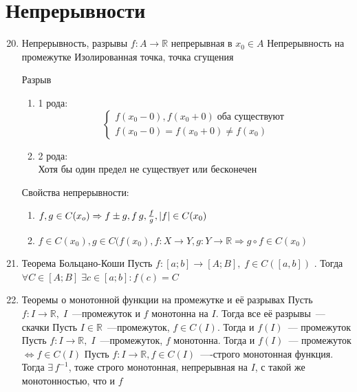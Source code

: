 \documentclass[a4paper,12pt]{article}
\newcommand\R{\mathbb{R}}
\theoremstyle{plain}
\theoremstyle{definition}
\theoremstyle{remark}
\def\resetdefs{ \setcounter{defn}{0}\setcounter{exmp}{0} }
\def\resetthrm{ \setcounter{thrm}{0}\setcounter{stat}{0} }
\def\resetrem{ \setcounter{rem}{0} }
\def\resetall{ \resetdefs \resetthrm \resetrem}
\def\itemrange#1{%
  \addtocounter{enumi}{1}%
  \edef\labelenumi{\theenumi--\noexpand\theenumi.}%
  \addtocounter{enumi}{-1}%
  \addtocounter{enumi}{#1}%
  \item
  \def\labelenumi{\theenumi.}
}
\begin{document}
\section*{Непрерывности}

\begin{enumerate}
  \setcounter{enumi}{19}
  \item Непрерывность, разрывы
    {  $f : A \to \R$ непрерывная в $x_0 \in A$}
    {  Непрерывность на промежутке }
    {  Изолированная точка, точка сгущения }
    {  Разрыв
      \begin{enumerate}
        \item 1 рода: 
          \begin{equation*}
            \left\{
            \begin{array}{l}
              f(x_0-0) , f(x_0 + 0) \; \text{оба существуют}\\ 
              f(x_0-0) = f(x_0 + 0) \neq f(x_0) 
            \end{array}
            \right.
          \end{equation*}
        \item 2 рода:\\
          Хотя бы один предел не существует или бесконечен
      \end{enumerate}
    }
    Свойства непрерывности:
    \begin{enumerate}
      \item $f, g \in C(x_o) \Rightarrow f \pm g , f\,g, 
        {f \over g}, |f| \in C(x_0)$
      \item $f \in C(x_0), g \in C(f(x_0), f : X \to Y, g : Y \to \R 
        \Rightarrow g \circ f \in C(x_0)$ 
    \end{enumerate}
  \item Теорема Больцано-Коши
    { \thrm Пусть $f : [a;b] \to [A;B],\; f \in C([a,b])$ . 
      Тогда $ \forall C \in [A;B]\; \exists c \in [a;b] : f(c) = C $
    }
  \itemrange{1} Теоремы о монотонной функции на промежутке и её разрывах
    \resetall
    { \thrm Пусть $f:I\to\R,\;I$~---промежуток и $f$ монотонна на $I$.
    Тогда все её разрывы~--- скачки }
    { \thrm Пусть $I \in\R $~---промежуток, $f\in C(I)$. Тогда и $f(I)$~--- промежуток }
    { \thrm Пусть $f:I \to\R,\;I$~---промежуток, $f$ монотонна. 
      Тогда и $f(I)$~--- промежуток $\Leftrightarrow f\in C(I)$ }
    { \thrm Пусть $f:I\to\R, f\in C(I)$~----строго монотонная функция.
      Тогда $\exists\,f^{-1}$, тоже строго монотонная, непрерывная на $I$, 
      с такой же монотонностью, что и $f$ }

\end{enumerate}
\end{document}
